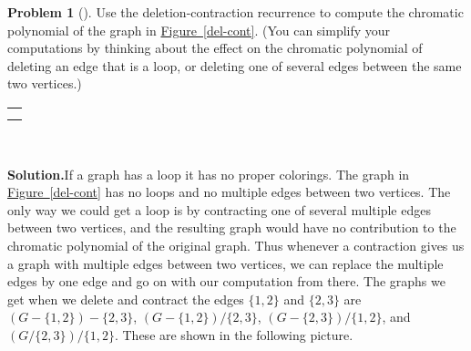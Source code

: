 \documentclass[10pt,]{book}
\theoremstyle{plain}
\theoremstyle{definition}
\newtheorem{activity}[project]{Problem}
\theoremstyle{definition}
\numberwithin{equation}{chapter}
\newlength{\panelmax}
\begin{document}
\begin{activity}[]\label{activity-244}
Use the deletion-contraction recurrence to compute the chromatic polynomial of the graph in \hyperref[del-cont]{Figure~\ref{del-cont}}. (You can simplify your computations by thinking about the effect on the chromatic polynomial of deleting an edge that is a loop, or deleting one of several edges between the same two vertices.)%
{%
\setlength{\panelmax}{0pt}
\newsavebox{\panelboxAAimage}
\newlength{\phAAimage}\setlength{\phAAimage}{\ht\panelboxAAimage+\dp\panelboxAAimage}
\settototalheight{\phAAimage}{\usebox{\panelboxAAimage}}
\setlength{\panelmax}{\maxof{\panelmax}{\phAAimage}}
\leavevmode%
\setlength{\tabcolsep}{0\linewidth}
\par\medskip\noindent
\hspace*{0.375\linewidth}%
\begin{tabular}{@{}*{1}{c}@{}}
\begin{minipage}[c][\panelmax][t]{0.25\linewidth}\usebox{\panelboxAAimage}\end{minipage}\tabularnewline
\parbox[t]{0.25\linewidth}{
}\end{tabular}\\
}%
\par\medskip\noindent%
\textbf{Solution.}\quad If a graph has a loop it has no proper colorings. The graph in \hyperref[del-cont]{Figure~\ref{del-cont}} has no loops and no multiple edges between two vertices. The only way we could get a loop is by contracting one of several multiple edges between two vertices, and the resulting graph would have no contribution to the chromatic polynomial of the original graph. Thus whenever a contraction gives us a graph with multiple edges between two vertices, we can replace the multiple edges by one edge and go on with our computation from there. The graphs we get when we delete and contract the edges \(\{1,2\}\) and \(\{2,3\}\) are \((G-\{1,2\})-\{2,3\}\), \((G-\{1,2\})/\{2,3\}\), \((G-\{2,3\})/\{1,2\}\), and \((G/\{2,3\})/\{1,2\}\). These are shown in the following picture.%

\end{activity}
\end{document}
